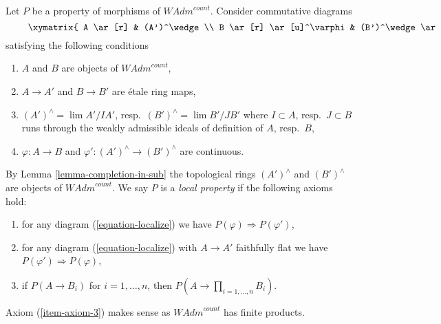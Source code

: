 \noindent
Let $P$ be a property of morphisms of $\textit{WAdm}^{count}$.
Consider commutative diagrams
\begin{equation}
\label{equation-localize}
\vcenter{
\xymatrix{
A \ar[r] & (A')^\wedge \\
B \ar[r] \ar[u]^\varphi & (B')^\wedge \ar[u]_{\varphi'}
}
}
\end{equation}
satisfying the following conditions
\begin{enumerate}
\item $A$ and $B$ are objects of $\textit{WAdm}^{count}$,
\item $A \to A'$ and $B \to B'$ are \'etale ring maps,
\item $(A')^\wedge = \lim A'/IA'$, resp.\  $(B')^\wedge = \lim B'/JB'$
where $I \subset A$, resp.\ $J \subset B$
runs through the weakly admissible ideals of definition of $A$, resp.\ $B$,
\item $\varphi : A \to B$ and $\varphi' : (A')^\wedge \to (B')^\wedge$
are continuous.
\end{enumerate}
By Lemma \ref{lemma-completion-in-sub} the topological rings
$(A')^\wedge$ and $(B')^\wedge$ are objects of $\textit{WAdm}^{count}$.
We say $P$ is a {\it local property} if the following axioms hold:
\begin{enumerate}
\item
\label{item-axiom-1}
for any diagram (\ref{equation-localize}) we have
$P(\varphi) \Rightarrow P(\varphi')$,
\item
\label{item-axiom-2}
for any diagram (\ref{equation-localize}) with $A \to A'$
faithfully flat we have
$P(\varphi') \Rightarrow P(\varphi)$,
\item
\label{item-axiom-3}
if $P(A \to B_i)$ for $i = 1, \ldots, n$, then
$P(A \to \prod_{i = 1, \ldots, n} B_i)$.
\end{enumerate}
Axiom (\ref{item-axiom-3})
makes sense as $\textit{WAdm}^{count}$ has finite products.

